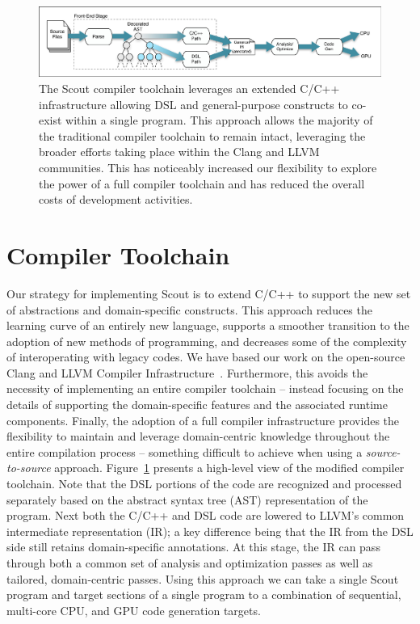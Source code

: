 \documentclass{tcvg}
\begin{document}
 \begin{figure}[ht]
		\centering
		\includegraphics[width=7in]{figures/toolchain-v2.pdf}
		\caption{The Scout compiler toolchain leverages an extended
          C/C++ infrastructure allowing DSL and general-purpose 
          constructs to co-exist within a single program.  This 
          approach allows the majority of the traditional compiler 
          toolchain to remain intact, leveraging the broader efforts 
          taking place within the Clang and LLVM communities.  This
          has noticeably increased our flexibility to explore 
          the power of a full compiler toolchain and has 
          reduced the overall costs of development activities.}
	\label{fig:toolchain}
    \end{figure}

  \section*{Compiler Toolchain}

    Our strategy for implementing Scout is to extend C/C++ to
    support the new set of abstractions and domain-specific constructs. 
    This approach reduces the learning curve of an entirely 
    new language, supports a smoother transition to the adoption of new
    methods of programming, and decreases some of the complexity of interoperating
    with legacy codes.  We have based our work on the open-source
    Clang and LLVM Compiler Infrastructure~\cite{Clang:2012,LLVM:2012}.  
    Furthermore, this avoids the necessity of implementing an entire 
    compiler toolchain -- instead focusing on the details of supporting 
    the domain-specific features and the associated runtime components.
    Finally, the adoption of a full compiler infrastructure provides  
    the flexibility to maintain and leverage domain-centric knowledge throughout the
    entire compilation process -- something
    difficult to achieve when using a \emph{source-to-source} approach. 
    Figure~\ref{fig:toolchain} presents a
    high-level view of the modified compiler toolchain.  Note that the
    DSL portions of the code are recognized and processed separately 
    based on the abstract syntax tree (AST) representation of the program.
    Next both the C/C++ and DSL code are lowered to LLVM's common 
    intermediate representation (IR); a key difference being that the IR
    from the DSL side still retains domain-specific annotations. At this 
    stage, the IR can pass through both a common set of analysis and 
    optimization passes as well as tailored, domain-centric passes. Using 
    this approach we can take a single Scout program and target sections 
    of a single program to a combination of sequential, multi-core CPU, 
    and GPU code generation targets.
\end{document}
